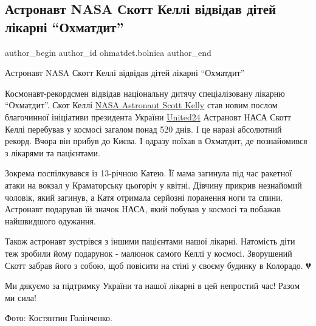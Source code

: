  
 
 
 
 
 
\subsection{Астронавт NASA Скотт Келлі відвідав дітей лікарні \enquote{Охматдит}}
\label{sec:28_11_2022.fb.ohmatdet.bolnica.1.astronavt}
 
\ifcmt
 author_begin
   author_id ohmatdet.bolnica
 author_end
\fi

Астронавт NASA Скотт Келлі відвідав дітей лікарні \enquote{Охматдит}💫

Космонавт-рекордсмен відвідав національну дитячу спеціалізовану лікарню
\enquote{Охматдит}. Скот Келлі \href{https://www.facebook.com/StationCDRKelly}{NASA
Astronaut Scott Kelly} став новим послом благочинної ініціативи президента
України \href{https://www.facebook.com/u24.gov.ua}{United24} Астрановт НАСА
Скотт Келлі перебував у космосі загалом понад 520 днів. І це наразі абсолютний
рекорд. Вчора він прибув до Києва. І одразу поїхав в Охматдит, де познайомився
з лікарями та пацієнтами.


Зокрема поспілкувався із 13-річною Катею. Її мама загинула під час ракетної
атаки на вокзал у Краматорську цьогоріч у квітні. Дівчину прикрив незнайомий
чоловік, який загинув, а Катя отримала серйозні поранення ноги та спини.
Астронавт подарував їй значок НАСА, який побував у космосі та побажав
найшвидшого одужання. 


Також астронавт зустрівся з іншими пацієнтами нашої лікарні. Натомість діти теж
зробили йому подарунок - малюнок самого Келлі у космосі. Зворушений Скотт
забрав його з собою, щоб повісити на стіні у своєму будинку в Колорадо. 💔

Ми дякуємо за підтримку України та нашої лікарні в цей непростий час! Разом ми
сила!🚀

Фото: Костянтин Голінченко.

